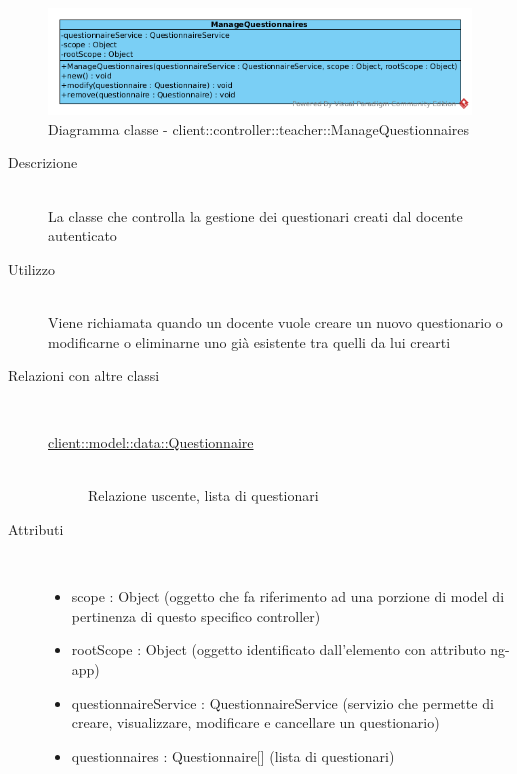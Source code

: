 \vspace{0.5cm}
\hypertarget{client::controller::teacher::ManageQuestionnaires}{}
\begin{center}
			\begin{figure}[H]
				\centering \includegraphics[scale=4, max width=\textwidth, max height=\myheight]{../img/diagrammiClassi/client/controller/teacher/ManageQuestionnaires.png}
				\caption{Diagramma classe - client::controller::teacher::ManageQuestionnaires}
			\end{figure}
		\end{center}\begin{description}
\item[Descrizione] \hfill \\
 La classe che controlla la gestione dei questionari creati dal docente autenticato
\item[Utilizzo] \hfill \\
 Viene richiamata quando un docente vuole creare un nuovo questionario o modificarne o eliminarne uno già esistente tra quelli da lui crearti
\item[Relazioni con altre classi] \hfill \\
 \vspace{-7mm}
\begin{description}
\item[\hyperlink{client::model::data::Questionnaire}{client::model::data::Questionnaire}] \hfill \\
 Relazione uscente, lista di questionari
\end{description}

\item[Attributi] \hfill \\
 \vspace{-7mm}
\begin{itemize}
\item scope : Object (oggetto che fa riferimento ad una porzione di model di pertinenza di questo specifico controller)
\item rootScope : Object (oggetto identificato dall’elemento con attributo ng-app)
\item questionnaireService : QuestionnaireService (servizio che permette di creare, visualizzare, modificare e cancellare un questionario)
\item questionnaires  : Questionnaire[] (lista di questionari)
\end{itemize}


\end{description}
